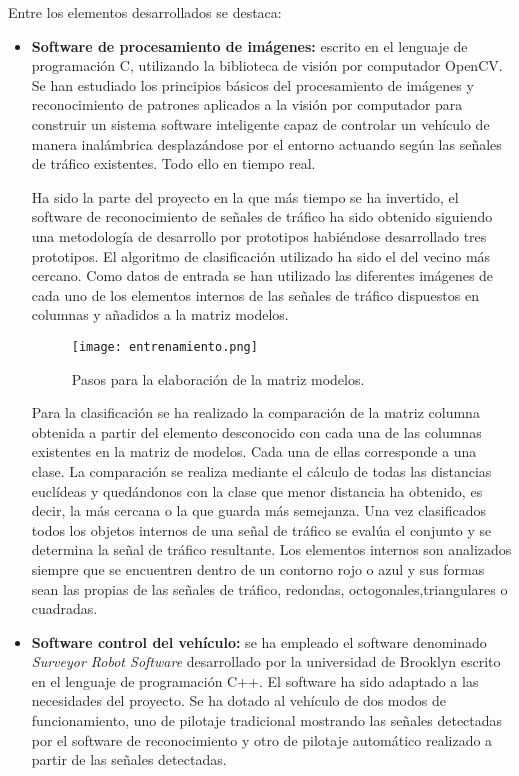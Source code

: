 Entre los elementos desarrollados se destaca:

\begin{itemize}

\item \textbf{Software de procesamiento de imágenes:} escrito en el lenguaje de programación C, utilizando la biblioteca de visión por computador OpenCV. Se han estudiado los principios básicos del procesamiento de imágenes y reconocimiento de patrones aplicados a la visión por computador para construir un sistema software inteligente capaz de controlar un vehículo de manera inalámbrica desplazándose por el entorno actuando según las señales de tráfico existentes. Todo ello en tiempo real.

Ha sido la parte del proyecto en la que más tiempo se ha invertido, el software de reconocimiento de señales de tráfico ha sido obtenido siguiendo una metodología de desarrollo por prototipos habiéndose desarrollado tres prototipos. El algoritmo de clasificación utilizado ha sido el del vecino más cercano. Como datos de entrada se han utilizado las diferentes imágenes de cada uno de los elementos internos de las señales de tráfico dispuestos en columnas y añadidos a la matriz modelos. 

\begin{figure}[H]
  \begin{center}
    \texttt{[image: entrenamiento.png]}
  \end{center}
  \caption{Pasos para la elaboración de la matriz modelos.}
  \label{fig:com-coche-pc}
\end{figure}


Para la clasificación se ha realizado la comparación de la matriz columna obtenida a partir del elemento desconocido con cada una de las columnas existentes en la matriz de modelos. Cada una de ellas corresponde a una clase. La comparación se realiza mediante el cálculo de todas las distancias euclídeas y quedándonos con la clase que menor distancia ha obtenido, es decir, la más cercana o la que guarda más semejanza. Una vez clasificados todos los objetos internos de una señal de tráfico se evalúa el conjunto y se determina la señal de tráfico resultante.  Los elementos internos son analizados siempre que se encuentren dentro de un contorno rojo o azul y sus formas sean las propias de las señales de tráfico, redondas, octogonales,triangulares o cuadradas.


\item \textbf{Software control del vehículo:} se ha empleado el software denominado \emph{Surveyor Robot Software} desarrollado por la universidad de Brooklyn escrito en el lenguaje de programación C++. El software ha sido adaptado a las necesidades del proyecto. Se ha dotado al vehículo de dos modos de funcionamiento, uno de pilotaje tradicional mostrando las señales detectadas por el software de reconocimiento y otro de pilotaje automático realizado a partir de las señales detectadas.


\end{itemize}
